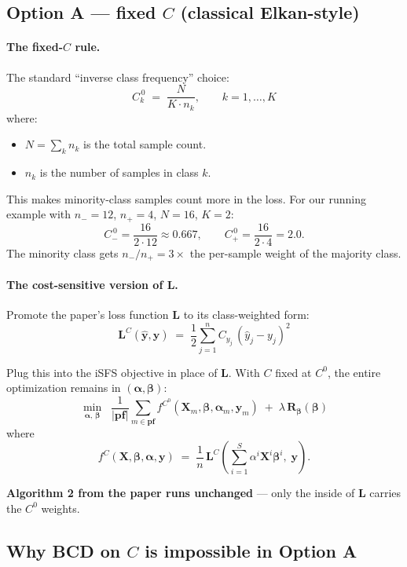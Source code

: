 \documentclass[11pt,a4paper]{article}
\begin{document}
\subsection{Option A --- fixed $C$ (classical Elkan-style)}

\paragraph{The fixed-$C$ rule.} The standard ``inverse class frequency'' choice:
\[
C_k^{\,0} \;=\; \frac{N}{K \cdot n_k},\qquad k = 1, \ldots, K
\]
where:
\begin{itemize}[leftmargin=*,itemsep=2pt]
  \item $N = \sum_k n_k$ is the total sample count.
  \item $n_k$ is the number of samples in class $k$.
\end{itemize}

This makes minority-class samples count more in the loss. For our running example with $n_- = 12$, $n_+ = 4$, $N = 16$, $K = 2$:
\[
C_-^{\,0} = \frac{16}{2\cdot 12} \approx 0.667,\qquad C_+^{\,0} = \frac{16}{2\cdot 4} = 2.0.
\]
The minority class gets $n_-/n_+ = 3\times$ the per-sample weight of the majority class.

\paragraph{The cost-sensitive version of $\mathbf{L}$.} Promote the paper's loss function $\mathbf{L}$ to its class-weighted form:
\[
\mathbf{L}^{C}(\hat{\mathbf{y}},\mathbf{y}) \;=\; \frac{1}{2}\sum_{j=1}^{n} C_{y_{j}}\,(\hat{y}_{j} - y_{j})^{2}
\]

Plug this into the iSFS objective in place of $\mathbf{L}$. With $C$ fixed at $C^0$, the entire optimization remains in $(\boldsymbol{\alpha}, \boldsymbol{\beta})$:
\[
\min_{\boldsymbol{\alpha},\,\boldsymbol{\beta}}\;\;\frac{1}{|\mathbf{pf}|}\sum_{m \in \mathbf{pf}} f^{C^{0}}(\mathbf{X}_m,\boldsymbol{\beta},\boldsymbol{\alpha}_m,\mathbf{y}_m) \;+\; \lambda\,\mathbf{R}_{\boldsymbol{\beta}}(\boldsymbol{\beta})
\]
where
\[
f^{C}(\mathbf{X},\boldsymbol{\beta},\boldsymbol{\alpha},\mathbf{y}) \;=\; \frac{1}{n}\,\mathbf{L}^{C}\!\left(\sum_{i=1}^{S}\alpha^{i}\mathbf{X}^{i}\boldsymbol{\beta}^{i},\;\mathbf{y}\right).
\]

\textbf{Algorithm 2 from the paper runs unchanged} --- only the inside of $\mathbf{L}$ carries the $C^0$ weights.

\subsection{Why BCD on $C$ is impossible in Option A}
\end{document}
